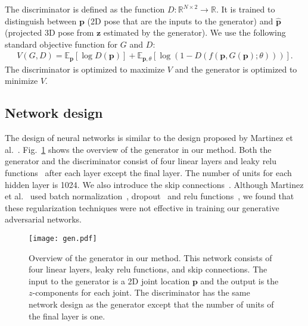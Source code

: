 \documentclass[runningheads]{llncs}
\newcommand{\matsui}[1]{\textbf{\textcolor{cyan}{[\textsc{MATSUI:} #1]}}}
\newcommand{\Fref}[1]{Fig.~\ref{#1}}
\begin{document}
The discriminator is defined as the function $D : \mathbb{R}^{N \times 2} \rightarrow \mathbb{R}$.
It is trained to distinguish between ${\bm p}$ (2D pose that are the inputs to the generator) and $\hat{\bm p}$ (projected 3D pose from ${\bm z}$ estimated by the generator).
We use the following standard objective function for $G$ and $D$:
\begin{eqnarray}
V(G, D) = \mathbb{E}_{\bm p}[\log D({\bm p})] + \mathbb{E}_{{\bm p}, \theta}[\log (1 - D(f({\bm p}, G({\bm p}); \theta)))].
\label{gan-objective}
\end{eqnarray}
The discriminator is optimized to maximize $V$ and the generator is optimized to minimize $V$.

\subsection{Network design}
The design of neural networks is similar to the design proposed by Martinez et al.~\cite{martinez20173dbaseline}. \Fref{gen} shows the overview of the generator in our method.
Both the generator and the discriminator consist of four linear layers and leaky relu functions~\cite{maas2013rectifier,xu2015empirical} after each layer except the final layer.
The number of units for each hidden layer is 1024.
We also introduce the skip connections~\cite{resnet}.
Although Martinez et al.~\cite{martinez20173dbaseline} used batch normalization~\cite{batchnorm}, dropout~\cite{dropout} and relu functions~\cite{relu}, we found that these regularization techniques were not effective in training our generative adversarial networks.

\begin{figure}[tb]
  \begin{center}
    \texttt{[image: gen.pdf]}
    \caption{
Overview of the generator in our method.
This network consists of four linear layers, leaky relu functions, and skip connections.
The input to the generator is a 2D joint location ${\bm p}$ and the output is the $z$-components for each joint.
The discriminator has the same network design as the generator except that the number of units of the final layer is one.
}
    \label{gen}
  \end{center}
\end{figure}
\end{document}
